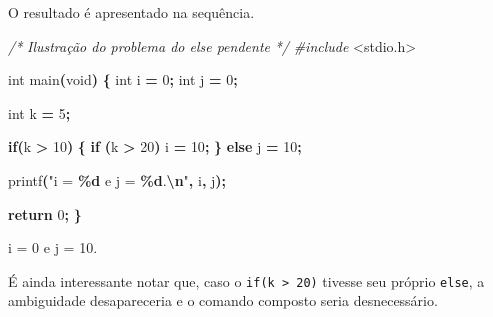 \documentclass[
  11pt,
  a4paper,
]{scrbook}
\newenvironment{Shaded}{\begin{snugshade}}{\end{snugshade}}
\newcommand{\CommentTok}[1]{\textcolor[rgb]{0.56,0.35,0.01}{\textit{#1}}}
\newcommand{\ControlFlowTok}[1]{\textcolor[rgb]{0.13,0.29,0.53}{\textbf{#1}}}
\newcommand{\DataTypeTok}[1]{\textcolor[rgb]{0.13,0.29,0.53}{#1}}
\newcommand{\DecValTok}[1]{\textcolor[rgb]{0.00,0.00,0.81}{#1}}
\newcommand{\ImportTok}[1]{#1}
\newcommand{\NormalTok}[1]{#1}
\newcommand{\OperatorTok}[1]{\textcolor[rgb]{0.81,0.36,0.00}{\textbf{#1}}}
\newcommand{\PreprocessorTok}[1]{\textcolor[rgb]{0.56,0.35,0.01}{\textit{#1}}}
\newcommand{\SpecialCharTok}[1]{\textcolor[rgb]{0.81,0.36,0.00}{\textbf{#1}}}
\newcommand{\StringTok}[1]{\textcolor[rgb]{0.31,0.60,0.02}{#1}}
\begin{document}
O resultado é apresentado na sequência.

\begin{Shaded}
\begin{Highlighting}[]
\CommentTok{/*}
\CommentTok{Ilustração do problema do else pendente}
\CommentTok{*/}
\PreprocessorTok{\#include }\ImportTok{\textless{}stdio.h\textgreater{}}

\DataTypeTok{int}\NormalTok{ main}\OperatorTok{(}\DataTypeTok{void}\OperatorTok{)} \OperatorTok{\{}
    \DataTypeTok{int}\NormalTok{ i }\OperatorTok{=} \DecValTok{0}\OperatorTok{;}
    \DataTypeTok{int}\NormalTok{ j }\OperatorTok{=} \DecValTok{0}\OperatorTok{;}

    \DataTypeTok{int}\NormalTok{ k }\OperatorTok{=} \DecValTok{5}\OperatorTok{;}

    \ControlFlowTok{if}\OperatorTok{(}\NormalTok{k }\OperatorTok{\textgreater{}} \DecValTok{10}\OperatorTok{)} \OperatorTok{\{}
        \ControlFlowTok{if} \OperatorTok{(}\NormalTok{k }\OperatorTok{\textgreater{}} \DecValTok{20}\OperatorTok{)}
\NormalTok{            i }\OperatorTok{=} \DecValTok{10}\OperatorTok{;}
    \OperatorTok{\}}
    \ControlFlowTok{else} 
\NormalTok{        j }\OperatorTok{=} \DecValTok{10}\OperatorTok{;}

\NormalTok{    printf}\OperatorTok{(}\StringTok{"i = }\SpecialCharTok{\%d}\StringTok{ e j = }\SpecialCharTok{\%d}\StringTok{.}\SpecialCharTok{\textbackslash{}n}\StringTok{"}\OperatorTok{,}\NormalTok{ i}\OperatorTok{,}\NormalTok{ j}\OperatorTok{);}
    
    \ControlFlowTok{return} \DecValTok{0}\OperatorTok{;}
\OperatorTok{\}}
\end{Highlighting}
\end{Shaded}

\begin{Shaded}
\begin{Highlighting}[]
\NormalTok{i = 0 e j = 10.}
\end{Highlighting}
\end{Shaded}

É ainda interessante notar que, caso o
\texttt{if(k\ \textgreater{}\ 20)} tivesse seu próprio \texttt{else}, a
ambiguidade desapareceria e o comando composto seria desnecessário.
\end{document}
